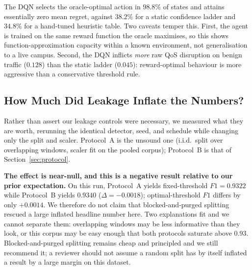 \documentclass[conference,a4paper]{IEEEtran}
\begin{document}
The DQN selects the oracle-optimal action in $98.8\%$ of states and attains essentially zero mean regret, against $38.2\%$ for a static confidence ladder and $34.8\%$ for a hand-tuned heuristic table. Two caveats temper this. First, the agent is trained on the same reward function the oracle maximises, so this shows function-approximation capacity within a known environment, not generalisation to a live campus. Second, the DQN inflicts \emph{more} raw QoS disruption on benign traffic ($0.128$) than the static ladder ($0.045$): reward-optimal behaviour is more aggressive than a conservative threshold rule.

\begin{table}[htbp]
\caption{Policy Controller Benchmark against a Brute-Force Oracle ($n=5{,}000$ held-out states). QoS disruption and regret are lower-is-better.}
\label{tab:policy_benchmark}
\begin{center}
\end{center}
\end{table}

\subsection{How Much Did Leakage Inflate the Numbers?}
\label{sec:leakage_effect}
Rather than assert our leakage controls were necessary, we measured what they are worth, rerunning the identical detector, seed, and schedule while changing only the split and scaler. Protocol~A is the unsound one (i.i.d.\ split over overlapping windows, scaler fit on the pooled corpus); Protocol~B is that of Section~\ref{sec:protocol}.

\textbf{The effect is near-null, and this is a negative result relative to our prior expectation.} On this run, Protocol~A yields fixed-threshold $F1 = 0.9322$ while Protocol~B yields $0.9340$ ($\Delta = -0.0018$); optimal-threshold $F1$ differs by only $+0.0014$. We therefore do not claim that blocked-and-purged splitting rescued a large inflated headline number here. Two explanations fit and we cannot separate them: overlapping windows may be less informative than they look, or this corpus may be easy enough that both protocols saturate above $0.93$. Blocked-and-purged splitting remains cheap and principled and we still recommend it; a reviewer should not assume a random split has by itself inflated a result by a large margin on this dataset.
\end{document}
